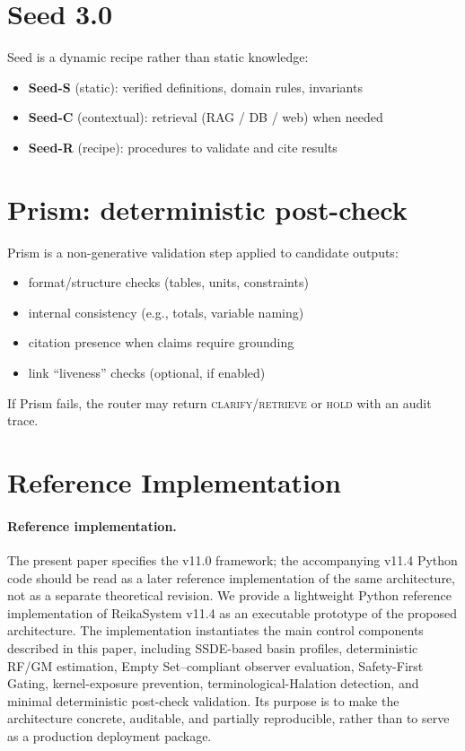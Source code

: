 \documentclass[11pt,a4paper]{article}
\begin{document}
\section{Seed 3.0}
\label{sec:seed}

Seed is a dynamic recipe rather than static knowledge:
\begin{itemize}
\item \textbf{Seed-S} (static): verified definitions, domain rules, invariants
\item \textbf{Seed-C} (contextual): retrieval (RAG / DB / web) when needed
\item \textbf{Seed-R} (recipe): procedures to validate and cite results
\end{itemize}

\section{Prism: deterministic post-check}
\label{sec:prism}

Prism is a non-generative validation step applied to candidate outputs:
\begin{itemize}
\item format/structure checks (tables, units, constraints)
\item internal consistency (e.g., totals, variable naming)
\item citation presence when claims require grounding
\item link ``liveness'' checks (optional, if enabled)
\end{itemize}
If Prism fails, the router may return \textsc{clarify}/\textsc{retrieve} or
\textsc{hold} with an audit trace.

\section{Reference Implementation}
\label{sec:impl}

\paragraph{Reference implementation.}
The present paper specifies the v11.0 framework; the accompanying v11.4 Python
code should be read as a later reference implementation of the same architecture,
not as a separate theoretical revision.
We provide a lightweight Python reference implementation of ReikaSystem v11.4
as an executable prototype of the proposed architecture.
The implementation instantiates the main control components described in this
paper, including SSDE-based basin profiles, deterministic RF/GM estimation,
Empty Set--compliant observer evaluation, Safety-First Gating,
kernel-exposure prevention, terminological-Halation detection,
and minimal deterministic post-check validation.
Its purpose is to make the architecture concrete, auditable, and partially
reproducible, rather than to serve as a production deployment package.
\end{document}

